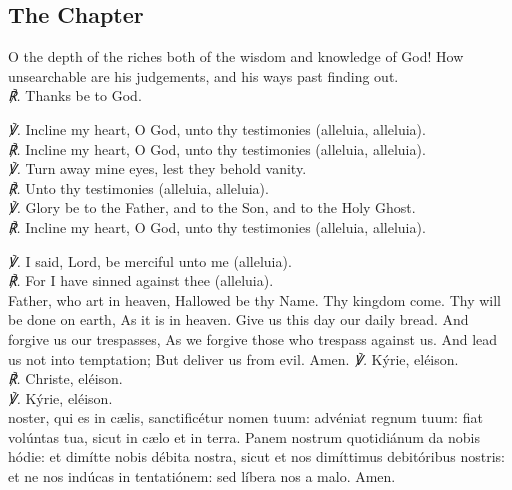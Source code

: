 \subsection{The Chapter}
O the depth of the riches both of the wisdom and knowledge of God! How unsearchable are his judgements, and his ways past finding out. \\
\textit{\scshape ℟.} Thanks be to God.\\
\par\noindent
\textit{\scshape ℣.} Incline my heart, O God, unto thy testimonies (alleluia, alleluia).\\
\textit{\scshape ℟.} Incline my heart, O God, unto thy testimonies (alleluia, alleluia).\\
\textit{\scshape ℣.} Turn away mine eyes, lest they behold vanity.\\
\textit{\scshape ℟.} Unto thy testimonies (alleluia, alleluia).\\
\textit{\scshape ℣.} Glory be to the Father, and to the Son, and to the Holy Ghost.\\
\textit{\scshape ℟.} Incline my heart, O God, unto thy testimonies (alleluia, alleluia).\\
\par\noindent
\textit{\scshape ℣.} I said, Lord, be merciful unto me (alleluia).\\
\textit{\scshape ℟.} For I have sinned against thee (alleluia).
\\
 Father, who art in heaven, Hallowed be thy Name. Thy kingdom come. Thy will be done on earth, As it is in heaven. Give us this day our daily bread. And forgive us our trespasses, As we forgive those who trespass against us. And lead us not into temptation; But deliver us from evil. Amen.
{
\textit{\scshape ℣.} Kýrie, eléison.\\
\textit{\scshape ℟.} Christe, eléison.\\
\textit{\scshape ℣.} Kýrie, eléison.\\
 noster, qui es in c{\ae}lis, sanctificétur nomen tuum: advéniat regnum tuum: fiat volúntas tua, sicut in c{\ae}lo et in terra. Panem nostrum quotidiánum da nobis hódie: et dimítte nobis débita nostra, sicut et nos dimíttimus debitóribus nostris: et ne nos indúcas in tentatiónem: sed líbera nos a malo. Amen.}
